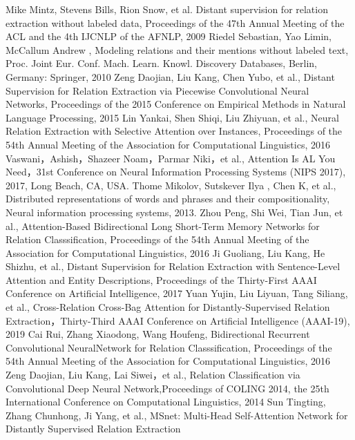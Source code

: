 \documentclass[UTF8]{csoarticle}
\begin{document}
\begin{thebibliography}{15}
     Mike Mintz, Stevens Bills, Rion Snow, et al. Distant supervision for relation extraction without labeled data, Proceedings of the 47th Annual Meeting of the ACL and the 4th IJCNLP of the AFNLP, 2009
     Riedel Sebastian, Yao Limin, McCallum Andrew , Modeling relations and their mentions without labeled text, Proc. Joint Eur. Conf. Mach. Learn. Knowl. Discovery Databases, Berlin, Germany: Springer, 2010
     Zeng Daojian, Liu Kang, Chen Yubo, et al., Distant Supervision for Relation Extraction via Piecewise Convolutional Neural Networks, Proceedings of the 2015 Conference on Empirical Methods in Natural Language Processing, 2015
     Lin Yankai, Shen Shiqi, Liu Zhiyuan, et al., Neural Relation Extraction with Selective Attention over Instances, Proceedings of the 54th Annual Meeting of the Association for Computational Linguistics, 2016
     Vaswani，Ashish，Shazeer Noam，Parmar Niki，et al., Attention Is AL You Need，31st Conference on Neural Information Processing Systems (NIPS 2017), 2017, Long Beach, CA, USA.
     Thome Mikolov, Sutskever Ilya , Chen K, et al., Distributed representations of words and phrases and their compositionality, Neural information processing systems, 2013.
     Zhou Peng, Shi Wei, Tian Jun, et al.,  Attention-Based Bidirectional Long Short-Term Memory Networks for Relation Classsification, Proceedings of the 54th Annual Meeting of the Association for Computational Linguistics, 2016
     Ji Guoliang, Liu Kang, He Shizhu, et al., Distant Supervision for Relation Extraction with Sentence-Level Attention and Entity Descriptions, Proceedings of the Thirty-First AAAI Conference on Artificial Intelligence, 2017
     Yuan Yujin, Liu Liyuan, Tang Siliang, et al., Cross-Relation Cross-Bag Attention for Distantly-Supervised Relation Extraction，Thirty-Third AAAI Conference on Artificial Intelligence (AAAI-19), 2019
     Cai Rui, Zhang Xiaodong, Wang Houfeng, Bidirectional Recurrent Convolutional NeuralNetwork for Relation Classsification, Proceedings of the 54th Annual Meeting of the Association for Computational Linguistics, 2016
     Zeng Daojian, Liu Kang, Lai Siwei，et al., Relation Classification via Convolutional Deep Neural Network,Proceedings of COLING 2014, the 25th International Conference on Computational Linguistics, 2014
     Sun Tingting, Zhang Chunhong, Ji Yang, et al., MSnet: Multi-Head Self-Attention Network for Distantly Supervised Relation Extraction
    
\end{thebibliography}
\end{document}
